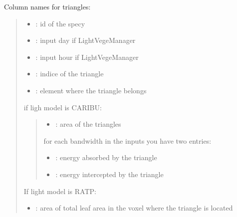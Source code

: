 \documentclass[letterpaper,10pt,english]{sphinxmanual}
\begin{document}
\sphinxAtStartPar
Column names for triangles:
\begin{quote}
\begin{itemize}
\item {} 
\sphinxAtStartPar
{}: id of the specy

\item {} 
\sphinxAtStartPar
{}: input day if LightVegeManager

\item {} 
\sphinxAtStartPar
{}: input hour if LightVegeManager

\item {} 
\sphinxAtStartPar
{}: indice of the triangle

\item {} 
\sphinxAtStartPar
{}: element where the triangle belongs

\end{itemize}

\sphinxAtStartPar
if ligh model is CARIBU:
\begin{quote}
\begin{itemize}
\item {} 
\sphinxAtStartPar
{}: area of the triangles

\end{itemize}

\sphinxAtStartPar
for each bandwidth in the inputs you have two entries:
\begin{itemize}
\item {} 
\sphinxAtStartPar
{}: energy absorbed by the triangle

\item {} 
\sphinxAtStartPar
{}: energy intercepted by the triangle

\end{itemize}
\end{quote}

\sphinxAtStartPar
If light model is RATP:
\begin{itemize}
\item {} 
\sphinxAtStartPar
{}: area of total leaf area in the voxel where the triangle is located


\end{itemize}
\end{quote}
\end{document}
